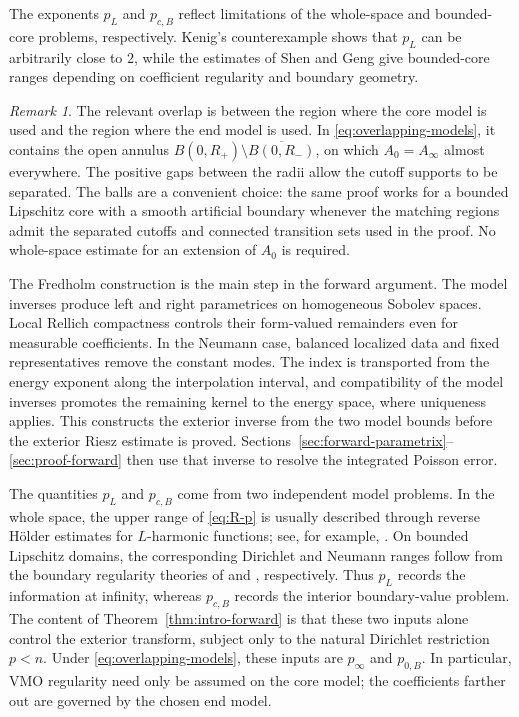 \documentclass[12pt]{amsart}
\theoremstyle{remark}
\newtheorem{remark}[theorem]{Remark}
\begin{document}
The exponents $p_L$ and $p_{c,B}$ reflect limitations of the whole-space
and bounded-core problems, respectively. Kenig's counterexample
\cite[Section~4.2.2, Theorem~7]{AuscherTchamitchian98} shows that
$p_L$ can be arbitrarily close to $2$, while the estimates of Shen
and Geng \cite{Shen05,Geng12} give bounded-core ranges depending
on coefficient regularity and boundary geometry.


\begin{remark}\label{rem:end-model}
The relevant overlap is between the region where the core model is used
and the region where the end model is used.  In
\eqref{eq:overlapping-models}, it contains the open annulus
$B(0,R_+)\setminus\overline{B(0,R_-)}$, on which
$A_0=A_\infty$ almost everywhere.  The positive gaps between the radii
allow the cutoff supports to be separated.  
The balls are a convenient choice: the same proof works for a bounded
Lipschitz core with a smooth artificial boundary whenever the matching
regions admit the separated cutoffs and connected transition sets used
in the proof.  No whole-space estimate for an extension of $A_0$ is required.  
\end{remark}


The Fredholm construction is the main step in the forward argument.
The model inverses produce left and right parametrices on homogeneous
Sobolev spaces.  Local Rellich compactness controls their form-valued
remainders even for measurable coefficients.  In the Neumann case,
balanced localized data and fixed representatives remove the constant
modes.  The index is transported from the energy exponent along the
interpolation interval, and compatibility of the model inverses promotes
the remaining kernel to the energy space, where uniqueness applies.
This constructs the exterior inverse from the two model bounds before
the exterior Riesz estimate is proved.  Sections~\ref{sec:forward-parametrix}--\ref{sec:proof-forward} then use that
inverse to resolve the integrated Poisson error.

The quantities $p_L$ and $p_{c,B}$ come from two independent model problems.  In the whole space, the upper range of \eqref{eq:R-p} is usually described through reverse H\"older estimates for $L$-harmonic functions;
see, for example, \cite{Shen05,CJKS,Jiang21}.  On bounded Lipschitz domains, the corresponding Dirichlet and Neumann ranges follow
from the boundary regularity theories of \cite{Shen05, JerisonKenig95} and \cite{Geng12,Zanger2000}, respectively.  Thus $p_L$ records the information at infinity, whereas
$p_{c,B}$ records the interior boundary-value problem.  The content of
Theorem~\ref{thm:intro-forward} is that these two inputs alone control the
exterior transform, subject only to the natural Dirichlet restriction
$p<n$.  Under \eqref{eq:overlapping-models}, these inputs are
$p_\infty$ and $p_{0,B}$.  In particular, VMO regularity need only be
assumed on the core model; the coefficients farther out are governed by
the chosen end model.  
\end{document}
